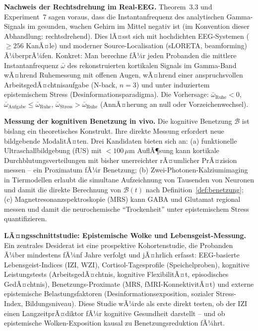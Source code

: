 ﻿\documentclass[12pt,a4paper]{report}
\theoremstyle{plain}
\theoremstyle{definition}
\theoremstyle{remark}
\begin{document}
	\textbf{Nachweis der Rechtsdrehung im Real-EEG.}
	Theorem~3.3 und Experiment~7 sagen voraus, dass die Instantanfrequenz
	des analytischen Gamma-Signals im gesunden, wachen Gehirn im Mittel
	negativ ist (im Konvention dieser Abhandlung: rechtsdrehend).
	Dies lÃ¤sst sich mit hochdichten EEG-Systemen ($\geq 256$ KanÃ¤le)
	und moderner Source-Localisation (sLORETA, beamforming) Ã¼berprÃ¼fen.
	Konkret: Man berechne fÃ¼r jeden Probanden die mittlere
	Instantanfrequenz $\bar{\omega}$ des rekonstruierten kortikalen
	Signals im Gamma-Band wÃ¤hrend Ruhemessung mit offenen Augen,
	wÃ¤hrend einer anspruchsvollen ArbeitsgedÃ¤chtnisaufgabe (N-back, $n=3$)
	und unter induziertem epistemischem Stress (Desinformationsparadigma).
	Die Vorhersage: $\bar{\omega}_{\text{Ruhe}} < 0$,
	$\bar{\omega}_{\text{Aufgabe}} \leq \bar{\omega}_{\text{Ruhe}}$,
	$\bar{\omega}_{\text{Stress}} > \bar{\omega}_{\text{Ruhe}}$
	(AnnÃ¤herung an null oder Vorzeichenwechsel).

	\textbf{Messung der kognitiven Benetzung in vivo.}
	Die kognitive Benetzung $\mathcal{B}$ ist bislang ein theoretisches
	Konstrukt. Ihre direkte Messung erfordert neue bildgebende ModalitÃ¤ten.
	Drei Kandidaten bieten sich an: (a) funktionelle Ultraschallbildgebung
	(fUS) mit $< 100\,\mu\mathrm{m}$ AuflÃ¶sung kann kortikale
	Durchblutungsverteilungen mit bisher unerreichter rÃ¤umlicher PrÃ¤zision
	messen -- ein Proximatum fÃ¼r Benetzung; (b) Zwei-Photonen-Kalziumimaging
	in Tiermodellen erlaubt die simultane Aufzeichnung von
	Tausenden von Neuronen und damit die direkte Berechnung von
	$\mathcal{B}(t)$ nach Definition~\ref{def:benetzung};
	(c) Magnetresonanzspektroskopie (MRS) kann GABA und Glutamat
	regional messen und damit die neurochemische ``Trockenheit''
	unter epistemischem Stress quantifizieren.

	\textbf{LÃ¤ngsschnittstudie: Epistemische Wolke und Lebensgeist-Messung.}
	Ein zentrales Desiderat ist eine prospektive Kohortenstudie,
	die Probanden Ã¼ber mindestens fÃ¼nf Jahre verfolgt und
	jÃ¤hrlich erfasst: EEG-basierte Lebensgeist-Indices (IZI, WZI),
	Cortisol-Tagesprofile (Speichelproben), kognitive Leistungstests
	(ArbeitsgedÃ¤chtnis, kognitive FlexibilitÃ¤t, episodisches GedÃ¤chtnis),
	Benetzungs-Proximate (MRS, fMRI-KonnektivitÃ¤t) und
	externe epistemische Belastungsfaktoren (Desinformationsexposition,
	sozialer Stress-Index, Bildungsniveau).
	Diese Studie wÃ¼rde als erste direkt testen, ob der IZI einen
	LangzeitprÃ¤diktor fÃ¼r kognitive Gesundheit darstellt -- und ob
	epistemische Wolken-Exposition kausal zu Benetzungsreduktion fÃ¼hrt.
\end{document}
